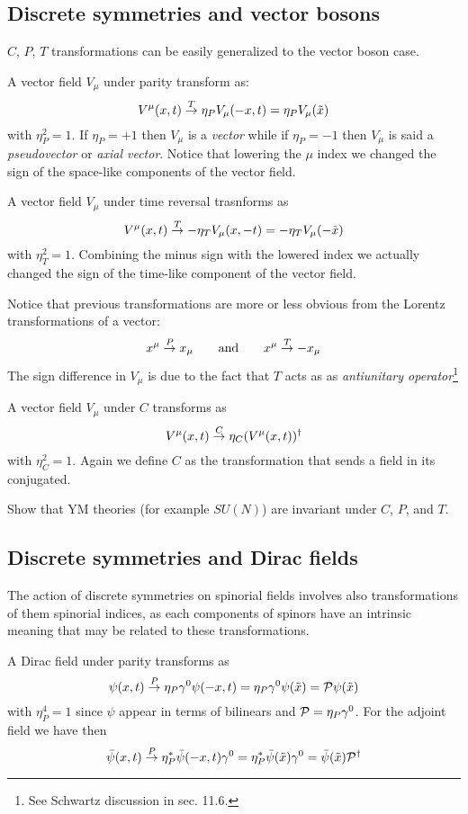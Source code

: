 \documentclass[TheoreticalPhy_ModB.tex]{subfiles}
\begin{document}
\subsection{Discrete symmetries and vector bosons}

$C$, $P$, $T$ transformations can be easily generalized to the vector boson case. 

A vector field $V_\mu$ under parity transform as:
\[V^\mu(x,t)\overset{T}{\to}\eta_PV_\mu(-x,t)=\eta_PV_\mu(\tilde x)\]
with $\eta_P^2=1$. If $\eta_P=+1$ then $V_\mu$ is a \emph{vector} while if $\eta_P=-1$ then $V_\mu$ is said a \emph{pseudovector} or \emph{axial vector}. Notice that lowering the $\mu$ index we changed the sign of the space-like components of the vector field.

A vector field $V_\mu$ under time reversal trasnforms as 
\[V^\mu(x, t)\overset{T}{\to}-\eta_TV_\mu( x,-t)=-\eta_TV_\mu(-\tilde x)\]
with $\eta_T^2=1$. Combining the minus sign with the lowered index we actually changed the sign of the time-like component of the vector field. 

Notice that previous transformations are more or less obvious from the Lorentz transformations of a vector:
\[x^\mu\overset{P}{\to} x_\mu\qquad\text{and}\qquad x^\mu\overset{T}{\to}-x_\mu\]
The sign difference in $V_\mu$ is due to the fact that $T$ acts as as \emph{antiunitary operator}\footnote{See Schwartz discussion in sec. 11.6.}

A vector field $V_\mu$ under $C$ transforms as 
\[V^\mu(x, t)\overset{C}{\to}\eta_C(V^\mu(x, t))^\dagger\]
with $\eta_C^2=1$. 
Again we define $C$ as the transformation that sends a field in its conjugated. 

\begin{exercise}
Show that YM theories (for example $SU(N)$) are invariant under $C$, $P$, and $T$. 
\end{exercise}

\subsection{Discrete symmetries and Dirac fields}

The action of discrete symmetries on spinorial fields involves also transformations of them spinorial indices, as each components of spinors have an intrinsic meaning that may be related to these transformations.  

A Dirac field under parity transforms as
\[\psi(x,t)\overset{P}{\to}\eta_P\gamma^0\psi(-x,t)=\eta_P\gamma^0\psi(\tilde x)=\mathcal P\psi(\tilde x)\]
with $\eta_P^4=1$ since $\psi$ appear in terms of bilinears and $\mathcal P=\eta_P\gamma^0$. For the adjoint field we have then
\[\bar\psi(x,t)\overset{P}{\to}\eta_P^*\bar\psi(-x,t)\gamma^0=\eta_P^*\bar\psi(\tilde x)\gamma^0=\bar\psi(\tilde x)\mathcal P^\dagger\]
\end{document}
